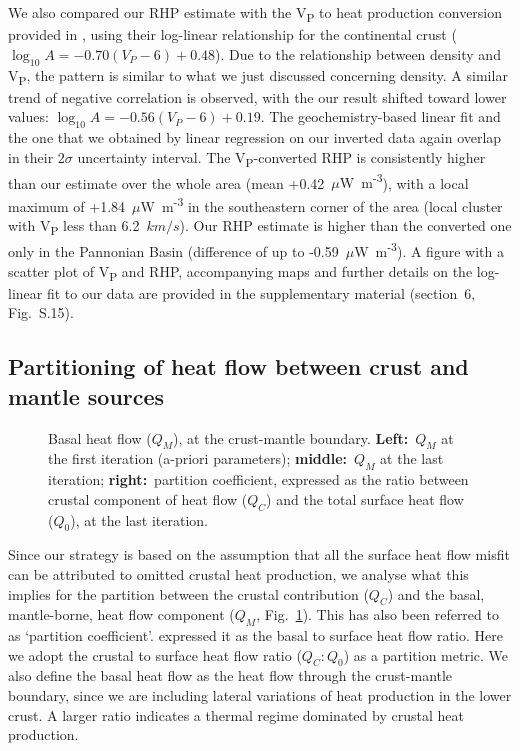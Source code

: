 {We also compared our RHP estimate with the V\textsubscript{P} to heat production conversion provided in \textcite{Hasterok2017_ign}, using their log-linear relationship for the continental crust ($\log_{10} A = -0.70 (V_{P} - 6) + 0.48$).
Due to the relationship between density and V\textsubscript{P}, the pattern is similar to what we just discussed concerning density. A similar trend of negative correlation is observed, with the our result shifted toward lower values: $\log_{10} A = -0.56 (V_{P} - 6) + 0.19$.
The geochemistry-based linear fit and the one that we obtained by linear regression on our inverted data again overlap in their $2\sigma$ uncertainty interval.
The V\textsubscript{P}-converted RHP is consistently higher than our estimate over the whole area (mean +0.42~{$\mu$W~m\textsuperscript{-3}}), with a local maximum of +1.84~{$\mu$W~m\textsuperscript{-3}} in the southeastern corner of the area (local cluster with V\textsubscript{P} less than 6.2~$km/s$).
Our RHP estimate is higher than the converted one only in the Pannonian Basin (difference of up to -0.59~{$\mu$W~m\textsuperscript{-3}}).
A figure with a scatter plot of V\textsubscript{P} and RHP, accompanying maps and further details on the log-linear fit to our data are provided in the supplementary material (section~6, Fig.~S.15).

\subsection{Partitioning of heat flow between crust and mantle sources}
\label{ss:Appl:DiscTherm:Partition}

\begin{figure}
	\begin{adjustbox}{center}
	\end{adjustbox}
	\caption{Basal heat flow ($Q_M$), at the crust-mantle boundary. \textbf{Left:}~$Q_M$ at the first iteration (a-priori parameters); \textbf{middle:}~$Q_M$ at the last iteration; \textbf{right:}~partition coefficient, expressed as the ratio between crustal component of heat flow ($Q_C$) and the total surface heat flow ($Q_0$), at the last iteration.}
	\label{fig:QM}
\end{figure}

Since our strategy is based on the assumption that all the surface heat flow misfit can be attributed to omitted crustal heat production, we analyse what this implies for the partition between the crustal contribution ($Q_C$) and the basal, mantle-borne, heat flow component ($Q_M$, Fig.~\ref{fig:QM}).
This has also been referred to as `partition coefficient'. \textcite{Hasterok2016} expressed it as the basal to surface heat flow ratio.
Here we adopt the crustal to surface heat flow ratio ($Q_C:Q_0$) as a partition metric.
We also define the basal heat flow as the heat flow through the crust-mantle boundary, since we are including lateral variations of heat production in the lower crust.
A larger ratio indicates a thermal regime dominated by crustal heat production.

}
